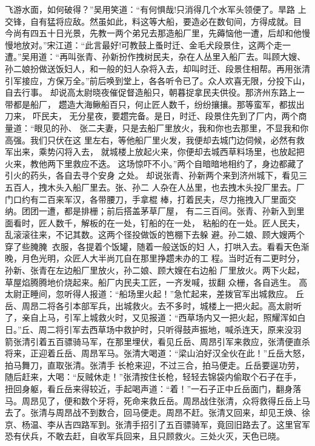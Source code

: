 飞游水面，如何破得？”吴用笑道：“有何惧哉!只消得几个水军头领便了。旱路
上交锋，自有猛将应敌。然虽如此，料这等大船，要造必在数旬间，方得成就。目
今尚有四五十日光景，先教一两个弟兄去那造船厂里，先薅恼他一遭，后却和他慢
慢地放对。”宋江道：“此言最好!可教鼓上蚤时迁、金毛犬段景住，这两个走一
遭。”吴用道：“再叫张青、孙新扮作拽树民夫，杂在人丛里入船厂去。叫顾大嫂、
孙二娘扮做送饭妇人，和一般的妇人杂将入去，却叫时迁、段景住相帮。再用张清
引军接应，方保万全。”前后唤到堂上，各各听令已了。众人欢喜无限，分投下山，
自去行事。
却说高太尉晓夜催促督造船只，朝暮捉拿民夫供役。那济州东路上一带都是船厂，
趱造大海鳅船百只，何止匠人数千，纷纷攘攘。那等蛮军，都拔出刀来，吓民夫，
无分星夜，要趱完备。是日，时迁、段景住先到了厂内，两个商量道：“眼见的孙、
张二夫妻，只是去船厂里放火，我和你也去那里，不显我和你高强。我们只伏在这
里左右，等他船厂里火发，我便却去城门边伺候，必然有救军出来，乘势闪将入去，
就城楼上放起火来，你便却去城西草料场里，也放起把火来，教他两下里救应不迭。
这场惊吓不小。”两个自暗暗地相约了，身边都藏了引火的药头，各自去寻个安身
之处。
却说张青、孙新两个来到济州城下，看见三五百人，拽木头入船厂里去。张、孙二
人杂在人丛里，也去拽木头投厂里去。厂门口约有二百来军汉，各带腰刀，手拿棍
棒，打着民夫，尽力拖拽入厂里面交纳。团团一遭，都是排栅；前后搭盖茅草厂屋，
有二三百间。张青、孙新入到里面看时，匠人数千，解板的在一处，钉船的在一处，
粘船的在一处。匠人民夫，乱滚滚往来，不记其数。这两个径投做饭的笆棚下去躲
避。孙二娘、顾大嫂两个穿了些腌腌衣服，各提着个饭罐，随着一般送饭的妇
人，打哄入去。看看天色渐晚，月色光明，众匠人大半尚兀自在那里挣趱未办的工
程。当时近有二更时分，孙新、张青在左边船厂里放火，孙二娘、顾大嫂在右边船
厂里放火。两下火起，草屋焰腾腾地价烧起来。船厂内民夫工匠，一齐发喊，拔翻
众栅，各自逃生。
高太尉正睡间，忽听得人报道：“船场里火起！”急忙起来，差拨官军出城救应。
丘岳、周昂二将各引本部军兵，出城救火。去不多时，城楼上一把火起。高太尉听
了，亲自上马，引军上城救火时，又见报道：“西草场内又一把火起，照耀浑如白
日。”丘、周二将引军去西草场中救护时，只听得鼓声振地，喊杀连天，原来没羽
箭张清引着五百骠骑马军，在那里埋伏，看见丘岳、周昂引军来救应，张清便直杀
将来，正迎着丘岳、周昂军马。张清大喝道：“梁山泊好汉全伙在此！”丘岳大怒，
拍马舞刀，直取张清。张清手长枪来迎，不过三合，拍马便走。丘岳要逞功劳，
随后赶来，大喝：“反贼休走！”张清按住长枪，轻轻去锦袋内偷取个石子在手，
扭回身躯，看丘岳来得较近，手起喝声道：“着！”一石子正中丘岳面门，翻身落
马。周昂见了，便和数个牙将，死命来救丘岳。周昂战住张清，众将救得丘岳上马
去了。张清与周昂战不到数合，回马便走。周昂不赶。张清又回来，却见王焕、徐
京、杨温、李从吉四路军到。张清手招引了五百骠骑军，竟回旧路去了。这里官军
恐有伏兵，不敢去赶，自收军兵回来，且只顾救火。三处火灭，天色已晓。
